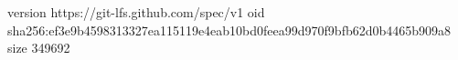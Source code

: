 version https://git-lfs.github.com/spec/v1
oid sha256:ef3e9b4598313327ea115119e4eab10bd0feea99d970f9bfb62d0b4465b909a8
size 349692
